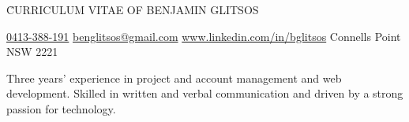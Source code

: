\documentclass{main}
\begin{document}
\h{CURRICULUM VITAE OF BENJAMIN GLITSOS}

\begin{center}
    \href{tel:0413-388-191}{0413-388-191} \textbar{} \href{mailto:benglitsos@gmail.com}{benglitsos@gmail.com} \textbar{} \href{www.linkedin.com/in/bglitsos}{www.linkedin.com/in/bglitsos} \textbar{} Connells Point NSW 2221
\end{center}


\begin{center}
    Three years' experience in project and account management and web development. Skilled in written and verbal communication and driven by a strong passion for technology.
\end{center}

\end{document}
